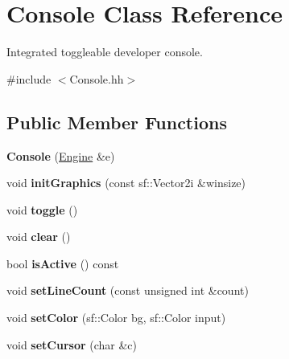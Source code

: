 \hypertarget{classConsole}{}\section{Console Class Reference}
\label{classConsole}


Integrated toggleable developer console.  




{\ttfamily \#include $<$Console.\+hh$>$}

\subsection*{Public Member Functions}
\begin{DoxyCompactItemize}
\item 
{\bfseries Console} (\hyperlink{classEngine}{Engine} \&e)\hypertarget{classConsole_ae948623138ea20074160fc8004cda111}{}\label{classConsole_ae948623138ea20074160fc8004cda111}

\item 
void {\bfseries init\+Graphics} (const sf\+::\+Vector2i \&winsize)\hypertarget{classConsole_af62ee9b064c2a7b5e2d3458cdfd98bbe}{}\label{classConsole_af62ee9b064c2a7b5e2d3458cdfd98bbe}

\item 
void {\bfseries toggle} ()\hypertarget{classConsole_ad0fb3ae7fe0f21999c71a138421bd0be}{}\label{classConsole_ad0fb3ae7fe0f21999c71a138421bd0be}

\item 
void {\bfseries clear} ()\hypertarget{classConsole_a8b4ffaeabbea48e1f3aa1e535ee88ab8}{}\label{classConsole_a8b4ffaeabbea48e1f3aa1e535ee88ab8}

\item 
bool {\bfseries is\+Active} () const \hypertarget{classConsole_a3b9de7e1192338c516570c1753dcba6a}{}\label{classConsole_a3b9de7e1192338c516570c1753dcba6a}

\item 
void {\bfseries set\+Line\+Count} (const unsigned int \&count)\hypertarget{classConsole_a7b2e6d42de564cea813229c6bd8f07ae}{}\label{classConsole_a7b2e6d42de564cea813229c6bd8f07ae}

\item 
void {\bfseries set\+Color} (sf\+::\+Color bg, sf\+::\+Color input)\hypertarget{classConsole_a3630b0f354654ef69551c91cbfe07b8f}{}\label{classConsole_a3630b0f354654ef69551c91cbfe07b8f}

\item 
void {\bfseries set\+Cursor} (char \&c)\hypertarget{classConsole_a7a7db54bbcf057da981adfc06c352e64}{}\label{classConsole_a7a7db54bbcf057da981adfc06c352e64}


\end{DoxyCompactItemize}
